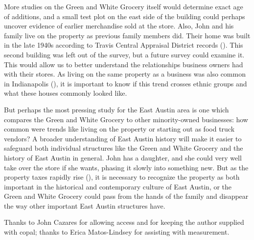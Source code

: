 
More studies on the Green and White Grocery itself would determine exact age of additions, and a small test plot on the east side of the building could perhaps uncover evidence of earlier merchandise sold at the store. Also, John and his family live on the property as previous family members did. Their home was built in the late 1940s according to Travis Central Appraisal District records (\cite[75-76]{tcad}). This second building was left out of the survey, but a future survey could examine it. This would allow us to better understand the relationships business owners had with their stores. As living on the same property as a business was also common in Indianapolis (\cite{mullins}), it is important to know if this trend crosses ethnic groups and what these houses commonly looked like.

But perhaps the most pressing study for the East Austin area is one which compares the Green and White Grocery to other minority-owned businesses: how common were trends like living on the property or starting out as food truck vendors? A broader understanding of East Austin history will make it easier to safeguard both individual structures like the Green and White Grocery and the history of East Austin in general. John has a daughter, and she could very well take over the store if she wants, phasing it slowly into something new. But as the property taxes rapidly rise (\cite{tcad}), it is necessary to recognize the property as both important in the historical and contemporary culture of East Austin, or the Green and White Grocery could pass from the hands of the family and disappear the way other important East Austin structures have.

\IJSRAseparator

Thanks to John Cazares for allowing access and for keeping the author supplied with copal; thanks to Erica Matos-Lindsey for assisting with measurement.

\IJSRAclosing%
